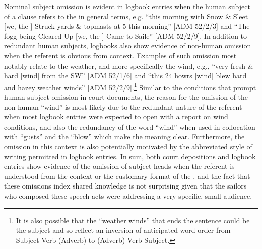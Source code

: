 Nominal subject omission is evident in logbook entries when the human subject of a clause refers to the  in general terms, e.g. “this morning with Snow \& Sleet [we, the ] Struck yards \& topmasts at 5 this morning” [ADM 52/2/3] and “The fogg being Cleared Up [we, the ] Came to Saile” [ADM 52/2/9]. In addition to redundant human subjects, logbooks also show evidence of non-human  omission when the referent is obvious from context. Examples of such omission most notably relate to the weather, and more specifically the wind, e.g., “very fresh \& hard [wind] from the SW” [ADM 52/1/6] and “this 24 howrs [wind] blew hard and hazey weather winds” [ADM 52/2/9].\footnote{It is also possible that the  “weather winds” that ends the sentence could be the subject and so reflect an inversion of anticipated word order from Subject-Verb-(Adverb) to (Adverb)-Verb-Subject.}  Similar to the conditions that prompt human subject omission in court documents, the reason for the omission of the non-human  “wind” is most likely due to the redundant nature of the referent when most logbook entries were expected to open with a report on wind conditions, and also the redundancy of the word “wind” when used in collocation with “gusts” and the  “blow” which make the meaning clear. Furthermore, the omission in this context is also potentially motivated by the abbreviated style of writing permitted in logbook entries. In sum, both court depositions and logbook entries show evidence of the omission of  subject heads when the referent is understood from the context or the customary format of the , and the fact that these omissions index shared knowledge is not surprising given that the sailors who composed these speech acts were addressing a very specific, small audience.

